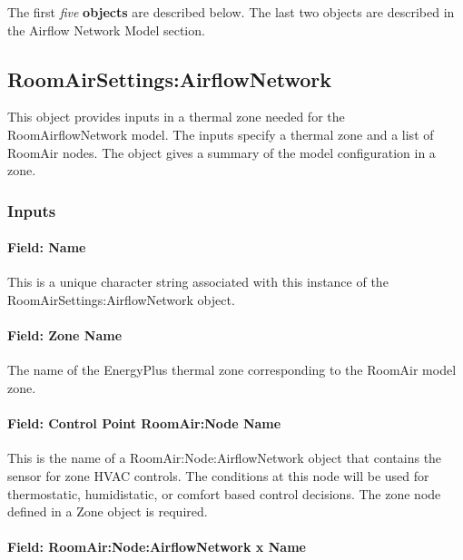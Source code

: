 The first \emph{five} \textbf{objects} are described below. The last two objects are described in the Airflow Network Model section.

\subsection{RoomAirSettings:AirflowNetwork}\label{roomairsettingsairflownetwork}

This object provides inputs in a thermal zone needed for the RoomAirflowNetwork model. The inputs specify a thermal zone and a list of RoomAir nodes. The object gives a summary of the model configuration in a zone.

\subsubsection{Inputs}\label{inputs-12-015}

\paragraph{Field: Name}\label{field-name-7-017}

This is a unique character string associated with this instance of the Room\-Air\-Settings:\-Air\-flow\-Net\-work object.

\paragraph{Field: Zone Name}\label{field-zone-name-8-002}

The name of the EnergyPlus thermal zone corresponding to the RoomAir model zone.

\paragraph{Field: Control Point RoomAir:Node Name}\label{field-control-point-roomairnode-name}

This is the name of a RoomAir:Node:AirflowNetwork object that contains the sensor for zone HVAC controls. The conditions at this node will be used for thermostatic, humidistatic, or comfort based control decisions. The zone node defined in a Zone object is required.

\paragraph{Field: RoomAir:Node:AirflowNetwork x Name}\label{field-roomairnodeairflownetwork-x-name}

